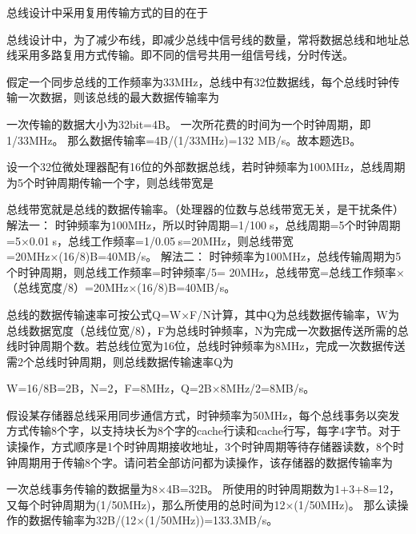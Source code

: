 \question 总线设计中采用复用传输方式的目的在于
\par{}
\begin{solution}总线设计中，为了减少布线，即减少总线中信号线的数量，常将数据总线和地址总线采用多路复用方式传输。即不同的信号共用一组信号线，分时传送。
\end{solution}
\question 假定一个同步总线的工作频率为33MHz，总线中有32位数据线，每个总线时钟传输一次数据，则该总线的最大数据传输率为
\par{}
\begin{solution}一次传输的数据大小为32bit=4B。
一次所花费的时间为一个时钟周期，即1/33MHz。
那么数据传输率=4B/(1/33MHz)=132 MB/s。故本题选B。
\end{solution}
\question 设一个32位微处理器配有16位的外部数据总线，若时钟频率为100MHz，总线周期为5个时钟周期传输一个字，则总线带宽是
\par{}
\begin{solution}总线带宽就是总线的数据传输率。（处理器的位数与总线带宽无关，是干扰条件）
解法一：
时钟频率为100MHz，所以时钟周期=1/100s，总线周期=5个时钟周期=5×0.01s，总线工作频率=1/0.05s=20MHz，则总线带宽=20MHz×(16/8)B=40MB/s。
解法二：
时钟频率为100MHz，总线传输周期为5个时钟周期，则总线工作频率=时钟频率/5=
20MHz，总线带宽=总线工作频率×（总线宽度/8）=20MHz×(16/8)B=40MB/s。
\end{solution}
\question 总线的数据传输速率可按公式Q=W×F/N计算，其中Q为总线数据传输率，W为总线数据宽度（总线位宽/8），F为总线时钟频率，N为完成一次数据传送所需的总线时钟周期个数。若总线位宽为16位，总线时钟频率为8MHz，完成一次数据传送需2个总线时钟周期，则总线数据传输速率Q为
\par{}
\begin{solution}W=16/8B=2B，N=2，F=8MHz，Q=2B×8MHz/2=8MB/s。
\end{solution}
\question 假设某存储器总线采用同步通信方式，时钟频率为50MHz，每个总线事务以突发方式传输8个字，以支持块长为8个字的cache行读和cache行写，每字4字节。对于读操作，方式顺序是1个时钟周期接收地址，3个时钟周期等待存储器读数，8个时钟周期用于传输8个字。请问若全部访问都为读操作，该存储器的数据传输率为
\par{}
\begin{solution}一次总线事务传输的数据量为8×4B=32B。
所使用的时钟周期数为1+3+8=12，又每个时钟周期为(1/50MHz)，那么所使用的总时间为12×(1/50MHz)。
那么读操作的数据传输率为32B/(12×(1/50MHz))=133.3MB/s。
\end{solution}
